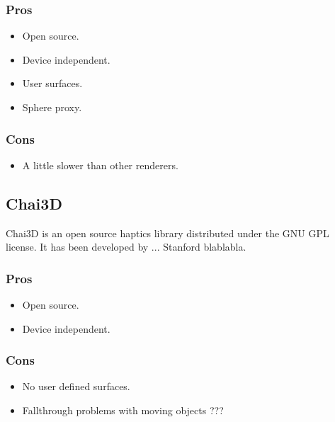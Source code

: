 \begin{minipage}[t]{3in}
\subsubsection{Pros}
\begin{itemize}
\item Open source.
\item Device independent.
\item User surfaces.
\item Sphere proxy.
\end{itemize}
\end{minipage}
\begin{minipage}[t]{3in}
\subsubsection{Cons}
\begin{itemize}
\item A little slower than other renderers.
\end{itemize}
\end{minipage}

\subsection{Chai3D}
Chai3D \cite{chai3d} is an open source haptics library distributed under the GNU GPL license. It has been developed by ... Stanford blablabla. 

\begin{minipage}[t]{3in}
\subsubsection{Pros}
\begin{itemize}
\item Open source.
\item Device independent.
\end{itemize}
\end{minipage}
\begin{minipage}[t]{3in}
\subsubsection{Cons}
\begin{itemize}
\item No user defined surfaces.
\item Fallthrough problems with moving objects ???
\end{itemize}
\end{minipage}


